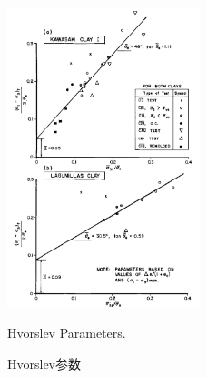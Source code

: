 \begin{figure}[!htb]
    \centering
    \includegraphics[width=0.5\textwidth]{figures/figure-15.png}
    \caption{Hvorslev Parameters.}
    \addtocounter{figure}{-1}
    \vspace{-5pt}
    \renewcommand{\figurename}{图}
    \caption{Hvorslev参数}
    \renewcommand{\figurename}{Figure}
    \label{figure:15}
\end{figure}